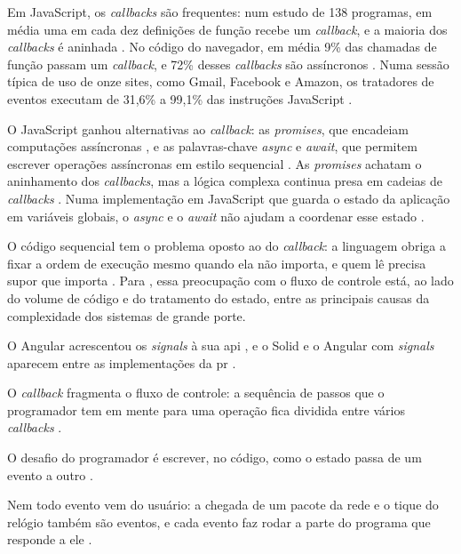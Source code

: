 Em JavaScript, os \emph{callbacks} são frequentes: num estudo de 138 programas, em
média uma em cada dez definições de função recebe um \emph{callback}, e a maioria dos
\emph{callbacks} é aninhada \cite[p. 1]{gallaba2015}.
No código do navegador, em média 9\% das chamadas de função passam um
\emph{callback}, e 72\% desses \emph{callbacks} são assíncronos \cite[p. 6]{gallaba2015}.
Numa sessão típica de uso de onze sites, como Gmail, Facebook e Amazon, os
tratadores de eventos executam de 31,6\% a 99,1\% das instruções JavaScript
\cite{ratanaworabhan2010}.

O JavaScript ganhou alternativas ao \emph{callback}: as \emph{promises}, que encadeiam
computações assíncronas \cite[p. 86:1]{madsen2017}, e as palavras-chave
\emph{async} e \emph{await}, que permitem escrever operações assíncronas em estilo
sequencial \cite[p. 9]{grolaux2026}.
As \emph{promises} achatam o aninhamento dos \emph{callbacks}, mas a lógica complexa
continua presa em cadeias de \emph{callbacks} \cite[p. 9]{grolaux2026}.
Numa implementação em JavaScript que guarda o estado da aplicação em variáveis
globais, o \emph{async} e o \emph{await} não ajudam a coordenar esse estado
\cite[p. 535 e 538]{berry2020}.

O código sequencial tem o problema oposto ao do \emph{callback}: a linguagem
obriga a fixar a ordem de execução mesmo quando ela não importa, e quem lê
precisa supor que importa \cite[p. 8-9]{moseley2006}.
Para \textcite[p. 1]{moseley2006}, essa preocupação com o fluxo de controle
está, ao lado do volume de código e do tratamento do estado, entre as
principais causas da complexidade dos sistemas de grande porte.

O Angular acrescentou os \emph{signals} à sua \gls{api} \cite[p. 18]{lima2024},
e o Solid e o Angular com \emph{signals} aparecem entre as implementações da
\gls{pr} \cite[p. 57]{tsukanova2026}.


O \emph{callback} fragmenta o fluxo de controle: a sequência de passos que o
programador tem em mente para uma operação fica dividida entre vários
\emph{callbacks} \cite[p. 134-135]{fischer2007}.

O desafio do programador é escrever, no código, como o estado passa de um
evento a outro \cite[p. N]{krishnamurthi2019}.

Nem todo evento vem do usuário: a chegada de um pacote da rede e o tique do
relógio também são eventos, e cada evento faz rodar a parte do programa que
responde a ele \cite[p. N]{krishnamurthi2019}.

